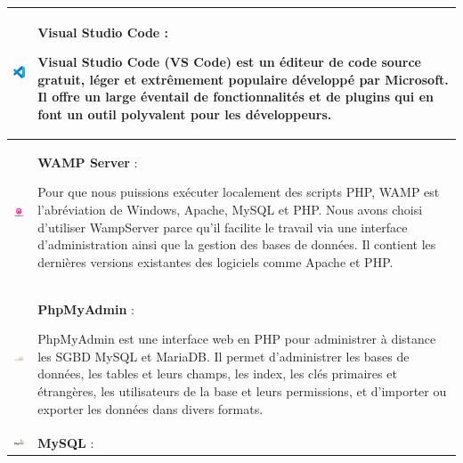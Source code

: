 \documentclass{article}
\begin{document}
                    \begin{table}[h!]
                        \centering
                        \begin{tabular}{|m{2cm}|m{15cm}|}
                            \hline
                            \includegraphics[width=2cm]{assets/logos/vscode.png} &
                            \textbf{Visual Studio Code} :
                            
                            Visual Studio Code (VS Code) est un éditeur de code source gratuit, léger et extrêmement populaire développé par Microsoft. Il offre un large éventail de fonctionnalités et de plugins qui en font un outil polyvalent pour les développeurs. \\
                            \hline
                            \includegraphics[width=2cm]{assets/logos/wamp.jpg} &
                            \textbf{WAMP Server} :
                            
                            Pour que nous puissions exécuter localement des scripts PHP, WAMP est l'abréviation de Windows, Apache, MySQL et PHP. Nous avons choisi d'utiliser WampServer parce qu'il facilite le travail via une interface d'administration ainsi que la gestion des bases de données. Il contient les dernières versions existantes des logiciels comme Apache et PHP. \\
                            \hline
                            \includegraphics[width=2cm]{assets/logos/OIP.jpg} &
                            \textbf{PhpMyAdmin} :
                            
                            PhpMyAdmin est une interface web en PHP pour administrer à distance les SGBD MySQL et MariaDB. Il permet d'administrer les bases de données, les tables et leurs champs, les index, les clés primaires et étrangères, les utilisateurs de la base et leurs permissions, et d'importer ou exporter les données dans divers formats. \\
                            \hline
                            \includegraphics[width=2cm]{assets/logos/mysql_PNG22.png} &
                            \textbf{MySQL} :
                            

\end{tabular}
\end{table}
\end{document}

